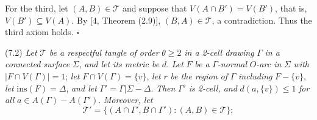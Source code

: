 For the third, let $(A, B) \in \mathscr{T}$ and suppose that $V(A \cap B') = V(B')$, that is, $V(B') \subseteq V(A)$. By [4, Theorem (2.9)], $(B, A) \in \mathscr{T}$, a contradiction. Thus the third axiom holds. $\square$

\stmt
(7.2) \textit{Let} $\mathscr{T}$ \textit{be a respectful tangle of order} $\theta \ge 2$ \textit{in a 2-cell drawing} $\Gamma$ \textit{in a connected surface} $\Sigma$, \textit{and let its metric be} $d$. \textit{Let} $F$ \textit{be a} $\Gamma$\textit{-normal} $O$\textit{-arc in} $\Sigma$ \textit{with} $|F \cap V(\Gamma)| = 1$; \textit{let} $F \cap V(\Gamma) = \{v\}$, \textit{let} $r$ \textit{be the region of} $\Gamma$ \textit{including} $F - \{v\}$, \textit{let} $\text{ins}(F) = \Delta$, \textit{and let} $\Gamma' = \Gamma | \overline{\Sigma - \Delta}$. \textit{Then} $\Gamma'$ \textit{is 2-cell, and} $d(a, \{v\}) \le 1$ \textit{for all} $a \in A(\Gamma) - A(\Gamma')$. \textit{Moreover, let}
\begin{equation*}
\mathscr{T}' = \{(A \cap \Gamma', B \cap \Gamma') : (A, B) \in \mathscr{T}\};
\end{equation*}
